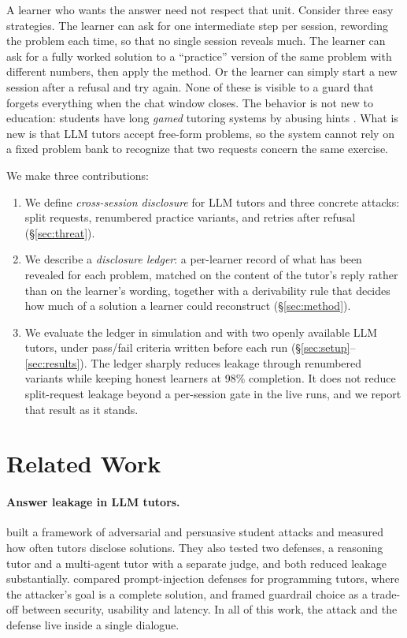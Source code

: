 \documentclass[11pt]{article}
\begin{document}
A learner who wants the answer need not respect that unit. Consider three easy strategies. The learner can ask for one intermediate step per session, rewording the problem each time, so that no single session reveals much. The learner can ask for a fully worked solution to a ``practice'' version of the same problem with different numbers, then apply the method. Or the learner can simply start a new session after a refusal and try again. None of these is visible to a guard that forgets everything when the chat window closes. The behavior is not new to education: students have long \emph{gamed} tutoring systems by abusing hints \citep{baker2004gaming}. What is new is that LLM tutors accept free-form problems, so the system cannot rely on a fixed problem bank to recognize that two requests concern the same exercise.

We make three contributions:
\begin{enumerate}
\item We define \emph{cross-session disclosure} for LLM tutors and three concrete attacks: split requests, renumbered practice variants, and retries after refusal (\S\ref{sec:threat}).
\item We describe a \emph{disclosure ledger}: a per-learner record of what has been revealed for each problem, matched on the content of the tutor's reply rather than on the learner's wording, together with a derivability rule that decides how much of a solution a learner could reconstruct (\S\ref{sec:method}).
\item We evaluate the ledger in simulation and with two openly available LLM tutors, under pass/fail criteria written before each run (\S\ref{sec:setup}--\ref{sec:results}). The ledger sharply reduces leakage through renumbered variants while keeping honest learners at 98\% completion. It does not reduce split-request leakage beyond a per-session gate in the live runs, and we report that result as it stands.
\end{enumerate}

\section{Related Work}

\paragraph{Answer leakage in LLM tutors.}
\citet{zhao-etal-2026-evaluating-answer} built a framework of adversarial and persuasive student attacks and measured how often tutors disclose solutions. They also tested two defenses, a reasoning tutor and a multi-agent tutor with a separate judge, and both reduced leakage substantially. \citet{maiorano2026prompt} compared prompt-injection defenses for programming tutors, where the attacker's goal is a complete solution, and framed guardrail choice as a trade-off between security, usability and latency. In all of this work, the attack and the defense live inside a single dialogue.
\end{document}
